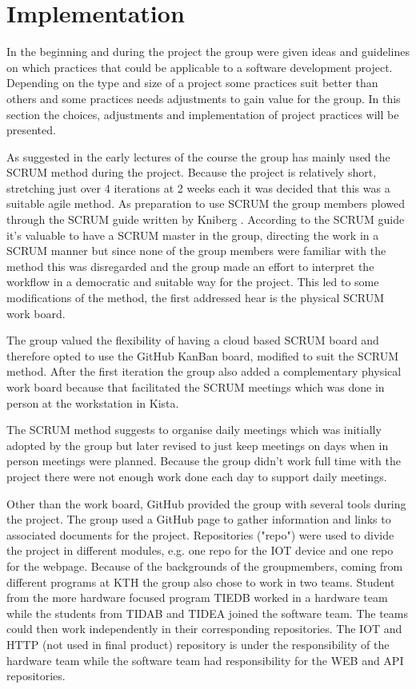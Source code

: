 
\section{Implementation}
In the beginning and during the project the group were given ideas and guidelines on which practices that could be applicable to a software development project. Depending on the type and size of a project some practices suit better than others and some practices needs adjustments to gain value for the group. In this section the choices, adjustments and implementation of project practices will be presented.

As suggested in the early lectures of the course the group has mainly used the SCRUM method during the project. Because the project is relatively short, stretching just over 4 iterations at 2 weeks each it was decided that this was a suitable agile method. As preparation to use SCRUM the group members plowed through the SCRUM guide written by Kniberg \cite{kniberg_scrum_2015}. According to the SCRUM guide it's valuable to have a SCRUM master in the group, directing the work in a SCRUM manner but since none of the group members were familiar with the method this was disregarded and the group made an effort to interpret the workflow in a democratic and suitable way for the project. This led to some modifications of the method, the first addressed hear is the physical SCRUM work board. 

The group valued the flexibility of having a cloud based SCRUM board and therefore opted to use the GitHub KanBan board, modified to suit the SCRUM method. After the first iteration the group also added a complementary physical work board  because that facilitated the SCRUM meetings which was done in person at the workstation in Kista. 

The SCRUM method suggests to organise daily meetings which was initially adopted by the group but later revised to just keep meetings on days when in person meetings were planned. Because the group didn't work full time with the project there were not enough work done each day to support daily meetings. 

Other than the work board, GitHub provided the group with several tools during the project. The group used a GitHub page to gather information and links to associated documents for the project. Repositories ("repo") were used to divide the project in different modules, e.g. one repo for the IOT device and one repo for the webpage. Because of the backgrounds of the groupmembers, coming from different programs at KTH the group also chose to work in two teams. Student from the more hardware focused program TIEDB worked in a hardware team while the students from TIDAB and TIDEA joined the software team. The teams could then work independently in their corresponding repositories. The IOT and HTTP (not used in final product) repository is under the responsibility of the hardware team while the software team had responsibility for the WEB and API repositories.

